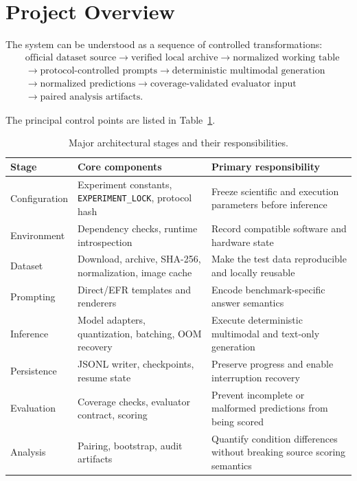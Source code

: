 \documentclass[11pt,a4paper]{article}
\newcommand{\code}[1]{\texttt{#1}}
\begin{document}
\section{Project Overview}
The system can be understood as a sequence of controlled transformations:
\[
\begin{aligned}
&\text{official dataset source} \rightarrow \text{verified local archive} \rightarrow \text{normalized working table} \\[2pt]
&\rightarrow \text{protocol-controlled prompts} \rightarrow \text{deterministic multimodal generation} \\[2pt]
&\rightarrow \text{normalized predictions} \rightarrow \text{coverage-validated evaluator input} \\[2pt]
&\rightarrow \text{paired analysis artifacts}.
\end{aligned}
\]

The principal control points are listed in Table~\ref{tab:architecture}.

\begin{table}[ht]
\centering
\small
\caption{Major architectural stages and their responsibilities.}
\label{tab:architecture}
\begin{tabular}{p{}p{}p{}}
\toprule
Stage & Core components & Primary responsibility \\
\midrule
Configuration & Experiment constants, \code{EXPERIMENT\_LOCK}, protocol hash & Freeze scientific and execution parameters before inference \\
Environment & Dependency checks, runtime introspection & Record compatible software and hardware state \\
Dataset & Download, archive, SHA-256, normalization, image cache & Make the test data reproducible and locally reusable \\
Prompting & Direct/EFR templates and renderers & Encode benchmark-specific answer semantics \\
Inference & Model adapters, quantization, batching, OOM recovery & Execute deterministic multimodal and text-only generation \\
Persistence & JSONL writer, checkpoints, resume state & Preserve progress and enable interruption recovery \\
Evaluation & Coverage checks, evaluator contract, scoring & Prevent incomplete or malformed predictions from being scored \\
Analysis & Pairing, bootstrap, audit artifacts & Quantify condition differences without breaking source scoring semantics \\
\bottomrule
\end{tabular}
\end{table}
\end{document}

